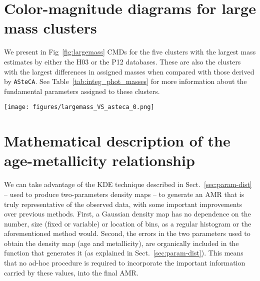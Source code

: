 \documentclass{aa}
\begin{document}
\begin{appendix}
\section{Color-magnitude diagrams for large mass clusters}
\label{apdx:largemass}

We present in Fig~\ref{fig:largemass} CMDs for the five clusters with the largest
mass estimates by either the H03 or the P12 databases. These are also the clusters
with the largest differences in assigned masses when compared with those derived
by \texttt{ASteCA}.
See Table~\ref{tab:integ_phot_masses} for more information about the fundamental
parameters assigned to these clusters.

\begin{figure*}
\texttt{[image: figures/largemass\_VS\_asteca\_0.png]}
\caption{CMDs for the clusters with the largest masses assigned by H03 and/or P12.
The best match synthetic cluster is plotted to the right, and the observed
cluster region CMD to the left, for each cluster.}
\label{fig:largemass}
\end{figure*}





\section{Mathematical description of the age-metallicity relationship}
\label{apdx:amr_description}

We can take advantage of the KDE technique described in
Sect.~\ref{sec:param-dist} -- used to produce two-parameters density maps -- to
generate an AMR that is truly representative of the observed data, with some
important improvements over previous methods.
%
First, a Gaussian density map has no dependence on the number, size 
(fixed or variable) or location of bins, as a regular histogram or the
aforementioned method would.
Second, the errors in the two parameters used to obtain the density map (age and
metallicity), are organically included in the function that generates it
(as explained in Sect.~\ref{sec:param-dist}).
This means that no ad-hoc procedure is required to incorporate the important
information carried by these values, into the final AMR.\@


\end{appendix}
\end{document}
